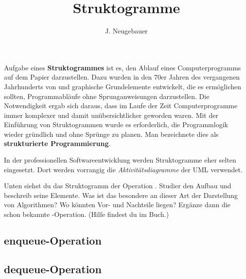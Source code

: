 \documentclass[10pt, a4paper]{scrartcl}
\author{J. Neugebauer}
\title{Struktogramme}
\date{\Heute}
\begin{document}
\ReiheTitel

\begin{infobox}
Aufgabe eines \textbf{Struktogrammes} ist es, den Ablauf eines Computerprogramms auf dem Papier darzustellen. Dazu wurden in den 70er Jahren des vergangenen Jahrhunderts von  und  graphische Grundelemente entwickelt, die es ermöglichen sollten, Programmabläufe ohne Sprunganweisungen darzustellen. Die Notwendigkeit ergab sich daraus, dass im Laufe der Zeit Computerprogramme immer komplexer und damit unübersichtlicher geworden waren. Mit der Einführung von Struktogrammen wurde es erforderlich, die Programmlogik wieder gründlich und ohne Sprünge zu planen. Man bezeichnete dies als \textbf{strukturierte Programmierung}.

In der professionellen Softwareentwicklung werden Struktogramme eher selten eingesetzt. Dort werden vorrangig die \emph{Aktivitätsdiagramme} der UML verwendet.
\end{infobox}

\begin{aufgabe}[subtitle=Operationen der Schlange]
	Unten siehst du das Struktogramm der Operation . Studier den Aufbau und beschreib seine Elemente. Was ist das besondere an dieser Art der Darstellung von Algorithmen? Wo könnten Vor- und Nachteile liegen? Ergänze dann die schon bekannte -Operation. (Hilfe findest du im Buch.)
\end{aufgabe}

\subsection*{enqueue-Operation}
\begin{rahmen}
\vspace{5cm}
\end{rahmen}

\subsection*{dequeue-Operation}
\end{document}
